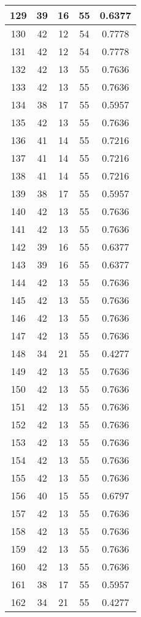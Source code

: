 \documentclass[letterpaper, 12pt]{article}
\begin{document}
\begin{longtable}{|c|c|c|c|c|}
\hline
129 & 39 & 16 & 55 & 0.6377 \\
\hline
130 & 42 & 12 & 54 & 0.7778 \\
\hline
131 & 42 & 12 & 54 & 0.7778 \\
\hline
132 & 42 & 13 & 55 & 0.7636 \\
\hline
133 & 42 & 13 & 55 & 0.7636 \\
\hline
134 & 38 & 17 & 55 & 0.5957 \\
\hline
135 & 42 & 13 & 55 & 0.7636 \\
\hline
136 & 41 & 14 & 55 & 0.7216 \\
\hline
137 & 41 & 14 & 55 & 0.7216 \\
\hline
138 & 41 & 14 & 55 & 0.7216 \\
\hline
139 & 38 & 17 & 55 & 0.5957 \\
\hline
140 & 42 & 13 & 55 & 0.7636 \\
\hline
141 & 42 & 13 & 55 & 0.7636 \\
\hline
142 & 39 & 16 & 55 & 0.6377 \\
\hline
143 & 39 & 16 & 55 & 0.6377 \\
\hline
144 & 42 & 13 & 55 & 0.7636 \\
\hline
145 & 42 & 13 & 55 & 0.7636 \\
\hline
146 & 42 & 13 & 55 & 0.7636 \\
\hline
147 & 42 & 13 & 55 & 0.7636 \\
\hline
148 & 34 & 21 & 55 & 0.4277 \\
\hline
149 & 42 & 13 & 55 & 0.7636 \\
\hline
150 & 42 & 13 & 55 & 0.7636 \\
\hline
151 & 42 & 13 & 55 & 0.7636 \\
\hline
152 & 42 & 13 & 55 & 0.7636 \\
\hline
153 & 42 & 13 & 55 & 0.7636 \\
\hline
154 & 42 & 13 & 55 & 0.7636 \\
\hline
155 & 42 & 13 & 55 & 0.7636 \\
\hline
156 & 40 & 15 & 55 & 0.6797 \\
\hline
157 & 42 & 13 & 55 & 0.7636 \\
\hline
158 & 42 & 13 & 55 & 0.7636 \\
\hline
159 & 42 & 13 & 55 & 0.7636 \\
\hline
160 & 42 & 13 & 55 & 0.7636 \\
\hline
161 & 38 & 17 & 55 & 0.5957 \\
\hline
162 & 34 & 21 & 55 & 0.4277 \\

\end{longtable}
\end{document}
